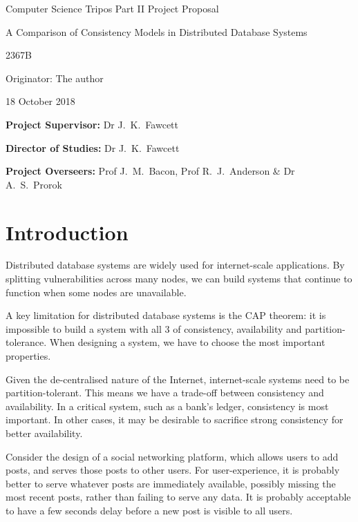 \setlength{\parindent}{0em}
\addtolength{\parskip}{1ex}

\vfil

\centerline{\Large Computer Science Tripos Part II Project Proposal}
\vspace{0.4in}
\centerline{\Large A Comparison of Consistency Models in Distributed Database Systems}
\vspace{0.4in}
\centerline{\large 2367B}
\vspace{0.3in}
\centerline{\large Originator: The author}
\vspace{0.3in}
\centerline{\large 18 October 2018}

\vfil

\vspace{0.2in}

\noindent
{\bf Project Supervisor:} Dr J.~K.~Fawcett
\vspace{0.2in}

\noindent
{\bf Director of Studies:} Dr J.~K.~Fawcett
\vspace{0.2in}
\noindent
 
\noindent
{\bf Project Overseers:} Prof J.~M.~Bacon, Prof R.~J.~Anderson \& Dr A.~S.~Prorok

\vfil
\pagebreak


\section*{Introduction}

Distributed database systems are widely used for internet-scale applications. By splitting vulnerabilities across many nodes, we can build systems that continue to function when some nodes are unavailable.

A key limitation for distributed database systems is the CAP theorem: it is impossible to build a system with all 3 of consistency, availability and partition-tolerance. When designing a system, we have to choose the most important properties.

Given the de-centralised nature of the Internet, internet-scale systems need to be partition-tolerant. This means we have a trade-off between consistency and availability. In a critical system, such as a bank's ledger, consistency is most important. In other cases, it may be desirable to sacrifice strong consistency for better availability.

Consider the design of a social networking platform, which allows users to add posts, and serves those posts to other users. For user-experience, it is probably better to serve whatever posts are immediately available, possibly missing the most recent posts, rather than failing to serve any data. It is probably acceptable to have a few seconds delay before a new post is visible to all users.

